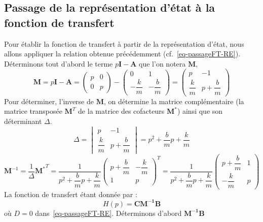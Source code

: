 \subsection{Passage de la représentation d'état à la fonction de transfert}
Pour établir la fonction de transfert à partir de la représentation d'état, nous
allons appliquer la relation obtenue précédemment (cf.~\cref{eq-passageFT-RE}).
Déterminons tout d'abord le terme $p\boldsymbol{I}-\boldsymbol{A}$ que l'on 
notera $\boldsymbol{M}$,
\[
    \boldsymbol{M}=
    p\boldsymbol{I}-\boldsymbol{A}=
    \begin{pmatrix}
        p&0\\
        0&p
    \end{pmatrix}-
    \begin{pmatrix}
        0 & 1 \\[1em]
        -\dfrac{k}{m} & -\dfrac{b}{m}
    \end{pmatrix}=
    \begin{pmatrix}
        p & -1 \\
        \dfrac{k}{m} & p+\dfrac{b}{m}
    \end{pmatrix}
\]
Pour déterminer, l'inverse de $\boldsymbol{M}$, on détermine la matrice
complémentaire (la matrice transposée $\boldsymbol{M}^T$ de la matrice des 
cofacteurs $\boldsymbol{M^*}$) ainsi que son déterminant $\Delta$.
\[
    \Delta=
    \begin{vmatrix} 
        p & -1 \\[1em]
        \dfrac{k}{m} & p+\dfrac{b}{m}
    \end{vmatrix}=
    p^2+\dfrac{b}{m}p+\dfrac{k}{m}
\]
\[
    \boldsymbol{M}^{-1}=\dfrac{1}{\Delta}\boldsymbol{M^*}^T=
    \dfrac{1}{p^2+\dfrac{b}{m}p+\dfrac{k}{m}}
    \begin{pmatrix}
        p+\dfrac{b}{m} & -\dfrac{k}{m}\\[1em]
        1 & p
    \end{pmatrix}^T=
    \dfrac{1}{p^2+\dfrac{b}{m}p+\dfrac{k}{m}}
    \begin{pmatrix}
        p+\dfrac{b}{m} & 1 \\[1em]
        -\dfrac{k}{m} & p
    \end{pmatrix}
\]
La fonction de transfert étant donnée par :
\[
    H(p)=\boldsymbol{C}\boldsymbol{M^{-1}}\boldsymbol{B}
\]
où $D=0$ dans~\cref{eq-passageFT-RE}.
Déterminons d'abord $\boldsymbol{M^{-1}}\boldsymbol{B}$
